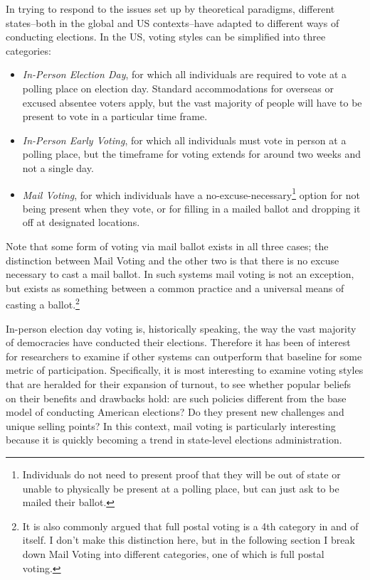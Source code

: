 \documentclass[12pt,twoside]{reedthesis}
\begin{document}
  In trying to respond to the issues set up by theoretical paradigms,
  different states--both in the global and US contexts--have adapted to
  different ways of conducting elections. In the US, voting styles can be
  simplified into three categories:
  
  \begin{itemize}
  \item
    \emph{In-Person Election Day}, for which all individuals are required
    to vote at a polling place on election day. Standard accommodations
    for overseas or excused absentee voters apply, but the vast majority
    of people will have to be present to vote in a particular time frame.
  \item
    \emph{In-Person Early Voting}, for which all individuals must vote in
    person at a polling place, but the timeframe for voting extends for
    around two weeks and not a single day.
  \item
    \emph{Mail Voting}, for which individuals have a
    no-excuse-necessary\footnote{Individuals do not need to present proof
      that they will be out of state or unable to physically be present at
      a polling place, but can just ask to be mailed their ballot.} option
    for not being present when they vote, or for filling in a mailed
    ballot and dropping it off at designated locations.
  \end{itemize}
  
  Note that some form of voting via mail ballot exists in all three cases;
  the distinction between Mail Voting and the other two is that there is
  no excuse necessary to cast a mail ballot. In such systems mail voting
  is not an exception, but exists as something between a common practice
  and a universal means of casting a ballot.\footnote{It is also commonly
    argued that full postal voting is a 4th category in and of itself. I
    don't make this distinction here, but in the following section I break
    down Mail Voting into different categories, one of which is full
    postal voting.}
  
  In-person election day voting is, historically speaking, the way the
  vast majority of democracies have conducted their elections. Therefore
  it has been of interest for researchers to examine if other systems can
  outperform that baseline for some metric of participation. Specifically,
  it is most interesting to examine voting styles that are heralded for
  their expansion of turnout, to see whether popular beliefs on their
  benefits and drawbacks hold: are such policies different from the base
  model of conducting American elections? Do they present new challenges
  and unique selling points? In this context, mail voting is particularly
  interesting because it is quickly becoming a trend in state-level
  elections administration.
  
\end{document}
